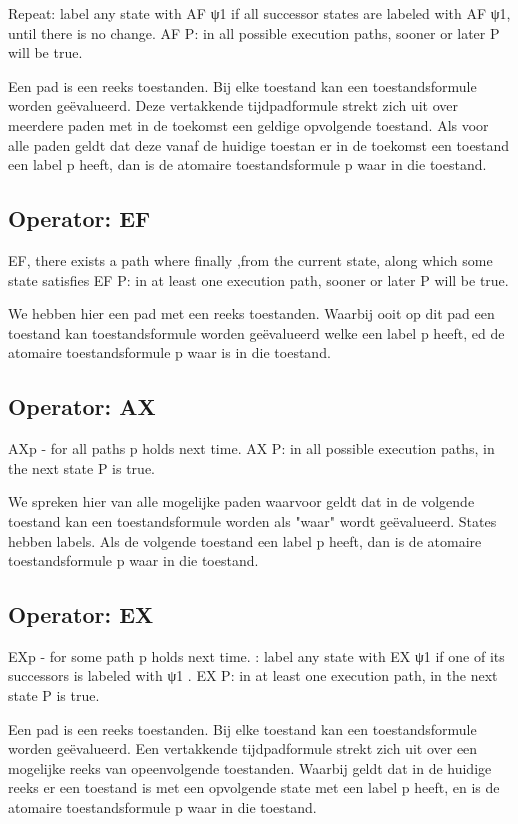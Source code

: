\documentclass{article}
\begin{document}
	Repeat: label any state with AF ψ1 if all successor states are labeled
	with AF ψ1, until there is no change.
	AF P: in all possible execution paths, sooner or later P will be true.
	
	Een pad is een reeks toestanden. Bij elke toestand kan een toestandsformule worden geëvalueerd. Deze vertakkende tijdpadformule strekt zich uit over meerdere paden met in de toekomst een geldige  opvolgende  toestand.
	Als voor alle paden geldt dat deze vanaf de huidige toestan er in  de toekomst een toestand een label p heeft, dan is de atomaire toestandsformule p waar in die toestand.
	
	
	\subsection{Operator: EF}
	EF, there exists a path where finally ,from the current state, along which some state satisfies
	EF P: in at least one execution path, sooner or later P will be true.
	
	We hebben hier een pad met een reeks toestanden. Waarbij ooit op dit pad een toestand kan  toestandsformule worden geëvalueerd welke  een label p heeft,  ed de atomaire toestandsformule p waar is in die toestand.
	\subsection{Operator: AX}
	AXp - for all paths p holds next time.
	AX P: in all possible execution paths, in the next state P is true.
	
	We spreken hier van alle mogelijke paden waarvoor geldt dat in de volgende toestand kan een toestandsformule worden als "waar" wordt geëvalueerd. 
	States hebben labels. Als de volgende toestand een label p heeft, dan is de atomaire toestandsformule p waar in die toestand.
	\subsection{Operator: EX}
	EXp - for some path p holds next time.
	: label any state with EX ψ1
	if one of its successors is labeled
	with ψ1
	.
	EX P: in at least one execution path, in the next state P is true.
	
	Een pad is een reeks toestanden. Bij elke toestand kan een toestandsformule worden geëvalueerd. Een vertakkende tijdpadformule strekt zich uit over een  mogelijke reeks van opeenvolgende toestanden.
	Waarbij geldt dat in de huidige reeks er een toestand is met een opvolgende state met een label p heeft, en is de atomaire toestandsformule p waar in die toestand.
\end{document}
